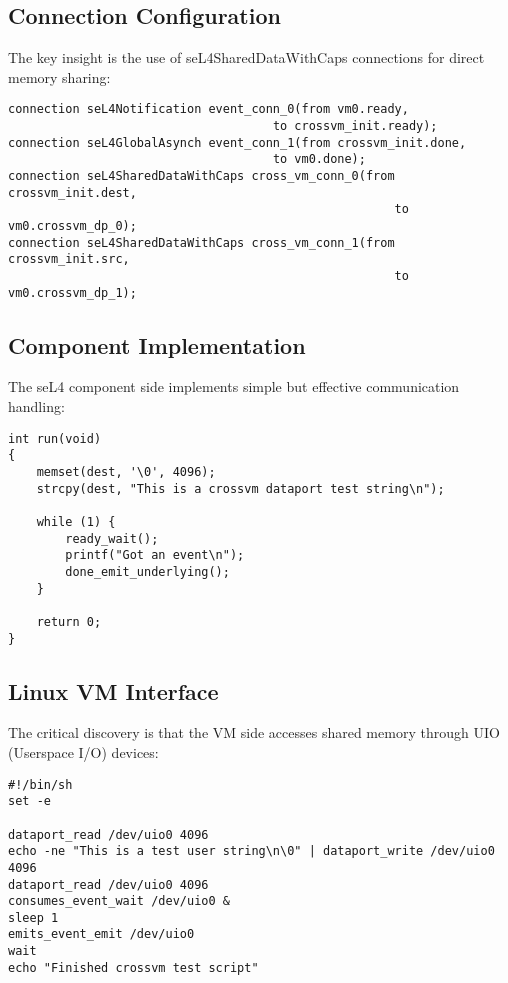 \documentclass[12pt,a4paper]{article}
\begin{document}
\subsection{Connection Configuration}

The key insight is the use of seL4SharedDataWithCaps connections for direct memory sharing:

\begin{lstlisting}[style=camkes, caption=Cross-VM connection setup]
connection seL4Notification event_conn_0(from vm0.ready,
                                     to crossvm_init.ready);
connection seL4GlobalAsynch event_conn_1(from crossvm_init.done,
                                     to vm0.done);
connection seL4SharedDataWithCaps cross_vm_conn_0(from crossvm_init.dest,
                                                      to vm0.crossvm_dp_0);
connection seL4SharedDataWithCaps cross_vm_conn_1(from crossvm_init.src,
                                                      to vm0.crossvm_dp_1);
\end{lstlisting}

\subsection{Component Implementation}

The seL4 component side implements simple but effective communication handling:

\begin{lstlisting}[style=camkes, caption=Working component implementation]
int run(void)
{
    memset(dest, '\0', 4096);
    strcpy(dest, "This is a crossvm dataport test string\n");

    while (1) {
        ready_wait();
        printf("Got an event\n");
        done_emit_underlying();
    }

    return 0;
}
\end{lstlisting}

\subsection{Linux VM Interface}

The critical discovery is that the VM side accesses shared memory through UIO (Userspace I/O) devices:

\begin{lstlisting}[style=bash, caption=Working VM-side test script]
#!/bin/sh
set -e

dataport_read /dev/uio0 4096
echo -ne "This is a test user string\n\0" | dataport_write /dev/uio0 4096
dataport_read /dev/uio0 4096
consumes_event_wait /dev/uio0 &
sleep 1
emits_event_emit /dev/uio0
wait
echo "Finished crossvm test script"
\end{lstlisting}
\end{document}
